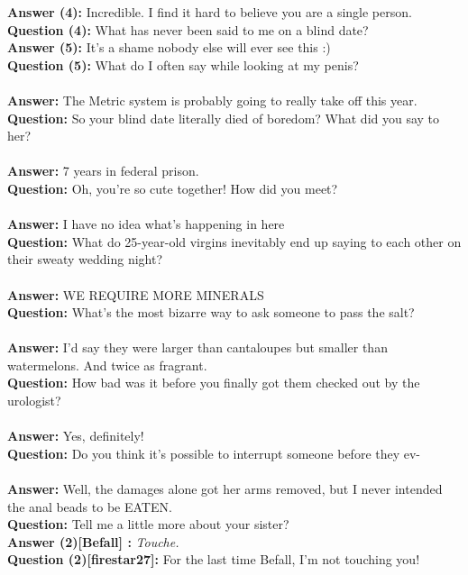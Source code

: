\documentclass[a4paper]{article}
\begin{document}
\textbf{Answer (4):} Incredible. I find it hard to believe you are a single person. \\
\textbf{Question (4):} What has never been said to me on a blind date? \\
\textbf{Answer (5):} It's a shame nobody else will ever see this :) \\
\textbf{Question (5):} What do I often say while looking at my penis? \\ \\
\textbf{Answer:} The Metric system is probably going to really take off this year. \\
\textbf{Question:} So your blind date literally died of boredom? What did you say to her? \\ \\
\textbf{Answer:} 7 years in federal prison. \\
\textbf{Question:} Oh, you're so cute together! How did you meet? \\ \\
\textbf{Answer:} I have no idea what's happening in here \\
\textbf{Question:} What do 25-year-old virgins inevitably end up saying to each other on their sweaty wedding night? \\ \\
\textbf{Answer:} WE REQUIRE MORE MINERALS \\
\textbf{Question:} What's the most bizarre way to ask someone to pass the salt? \\ \\
\textbf{Answer:} I'd say they were larger than cantaloupes but smaller than watermelons. And twice as fragrant. \\
\textbf{Question:} How bad was it before you finally got them checked out by the urologist? \\ \\
\textbf{Answer:} Yes, definitely! \\
\textbf{Question:} Do you think it's possible to interrupt someone before they ev- \\ \\
\textbf{Answer:} Well, the damages alone got her arms removed, but I never intended the anal beads to be EATEN. \\
\textbf{Question:} Tell me a little more about your sister? \\
\textbf{Answer (2)[Befall] :} \textit{Touche.} \\
\textbf{Question (2)[firestar27]:} For the last time Befall, I'm not touching you! \\ \\
\end{document}
